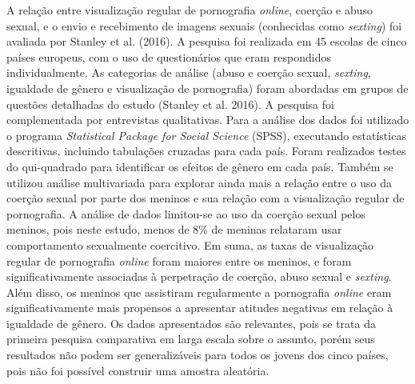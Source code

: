 A relação entre visualização regular de pornografia \textit{online}, coerção e abuso sexual, e o envio e recebimento de imagens sexuais (conhecidas como \textit{sexting}) foi avaliada por Stanley et al. (2016). A pesquisa foi realizada em 45 escolas de cinco países europeus, com o uso de questionários que eram respondidos individualmente. As categorias de análise (abuso e coerção sexual, \textit{sexting}, igualdade de gênero e visualização de pornografia) foram abordadas em grupos de questões detalhadas do estudo (Stanley et al. 2016). A pesquisa foi complementada por entrevistas qualitativas. Para a análise dos dados foi utilizado o programa \textit{Statistical Package for Social Science} (SPSS), executando estatísticas descritivas, incluindo tabulações cruzadas para cada país. Foram realizados testes do qui-quadrado para identificar os efeitos de gênero em cada país. Também se utilizou análise multivariada para explorar ainda mais a relação entre o uso da coerção sexual por parte dos meninos e sua relação com a visualização regular de pornografia. A análise de dados limitou-se ao uso da coerção sexual pelos meninos, pois neste estudo, menos de 8\% de meninas relataram usar comportamento sexualmente coercitivo. Em suma, as taxas de visualização regular de pornografia \textit{online} foram maiores entre os meninos, e foram significativamente associadas à perpetração de coerção, abuso sexual e \textit{sexting}. Além disso, os meninos que assistiram regularmente a pornografia \textit{online} eram significativamente mais propensos a apresentar atitudes negativas em relação à igualdade de gênero. Os dados apresentados são relevantes, pois se trata da primeira pesquisa comparativa em larga escala sobre o assunto, porém seus resultados não podem ser generalizáveis para todos os jovens dos cinco países, pois não foi possível construir uma amostra aleatória. 

